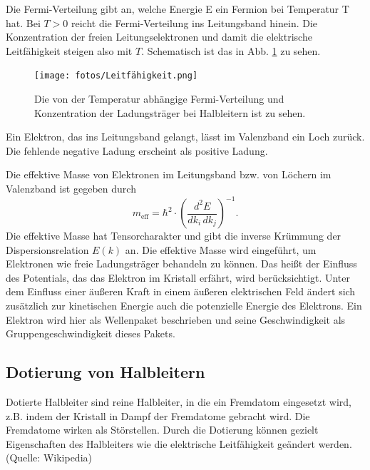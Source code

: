Die Fermi-Verteilung gibt an, welche Energie E ein Fermion bei Temperatur T hat. Bei $T > \num{0}$ reicht die Fermi-Verteilung ins Leitungsband hinein. Die Konzentration der freien Leitungselektronen und damit die elektrische Leitfähigkeit steigen also mit $T$. Schematisch ist das in Abb. \ref{fig:Leitfähigkeit} zu sehen. \cite{demtroeder} %

\begin{figure}
    \centering
    \texttt{[image: fotos/Leitfähigkeit.png]}
    \caption{Die von der Temperatur abhängige Fermi-Verteilung und Konzentration der Ladungsträger bei Halbleitern ist zu sehen. \cite{demtroeder}}
    \label{fig:Leitfähigkeit}
\end{figure}

Ein Elektron, das ins Leitungsband gelangt, lässt im Valenzband ein Loch zurück. Die fehlende negative Ladung erscheint als positive Ladung. \cite{demtroeder}

Die effektive Masse von Elektronen im Leitungsband bzw. von Löchern im Valenzband ist gegeben durch
\begin{equation}
    m_\text{eff} = \hbar^2 \cdot \left( \frac{d^2 E}{dk_i \, dk_j} \right)^{-1}.
    \label{eq:m_eff}
\end{equation}
Die effektive Masse hat Tensorcharakter und gibt die inverse Krümmung der Dispersionsrelation $E(k)$ an. \cite{demtroeder}
Die effektive Masse wird eingeführt, um Elektronen wie freie Ladungsträger behandeln zu können. Das heißt der Einfluss des Potentials, das das Elektron im Kristall erfährt, wird berücksichtigt. Unter dem Einfluss einer äußeren Kraft in einem äußeren elektrischen Feld ändert sich zusätzlich zur kinetischen Energie auch die potenzielle Energie des Elektrons. Ein Elektron wird hier als Wellenpaket beschrieben und seine Geschwindigkeit als Gruppengeschwindigkeit dieses Pakets. \cite{demtroeder}

\subsection{Dotierung von Halbleitern}
Dotierte Halbleiter sind reine Halbleiter, in die ein Fremdatom eingesetzt wird, z.B. indem der Kristall in Dampf der Fremdatome gebracht wird. Die Fremdatome wirken als Störstellen. \cite{demtroeder}
Durch die Dotierung können gezielt Eigenschaften des Halbleiters wie die elektrische Leitfähigkeit geändert werden. (Quelle: Wikipedia)


